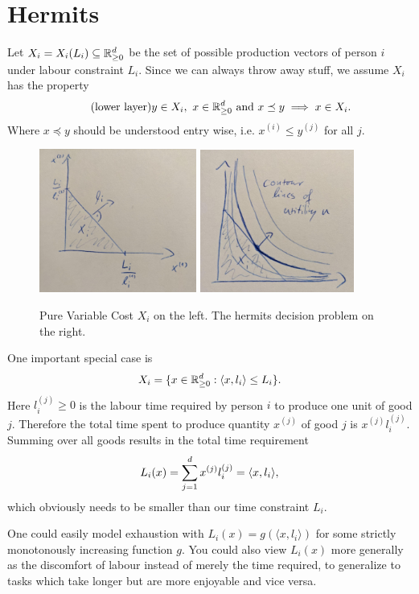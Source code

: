 \section{Hermits}

Let \(X_i = X_i(L_i)\subseteq \mathbb{R}_{\ge 0}^d\) be the set of possible production vectors of person \(i\)
under labour constraint \(L_i\). Since we can always throw away stuff, we
assume \(X_i\) has the property
\[
	\label{eq: lower layer}
	\tag{lower layer}
	y\in X_i,\ x\in\mathbb{R}_{\ge 0}^d \text{ and } x\preceq y \implies x\in X_i.
\]
Where \(x \preceq y\) should be understood entry wise, i.e. \(x^{(i)} \le
y^{(j)}\) for all \(j\).

\begin{figure}
	\centering
	\includegraphics[width=0.46\textwidth]{images/pure-variable-cost.jpeg}
	\includegraphics[width=0.45\textwidth]{images/hermit-decision-pure-variable.jpeg}
	\caption{
		Pure Variable Cost \(X_i\) on the left. The hermits decision problem
		on the right.
	}
\end{figure}
\begin{example*}
	One important special case is
	\[
		X_i = \{ x \in \mathbb{R}_{\ge 0}^d: \langle x, l_i \rangle \le L_i \}.
	\]
	Here \(l_i^{(j)}\ge0\) is the labour time required by person \(i\) to produce one
	unit of good \(j\). Therefore the total time spent to produce quantity
	\(x^{(j)}\) of good \(j\) is \(x^{(j)}l_i^{(j)}\). Summing over all goods
	results in the total time requirement
	\[
		L_i(x) = \sum_{j=1}^d x^{(j)}l_i^{(j)} = \langle x, l_i\rangle,
	\]
	which obviously needs to be smaller than our time constraint \(L_i\).

	One could easily model exhaustion with \(L_i(x) = g(\langle x, l_i\rangle)\)
	for some strictly monotonously increasing function \(g\). You could also
	view \(L_i(x)\) more generally as the discomfort of labour instead of merely
	the time required, to generalize to tasks which take longer but are more
	enjoyable and vice versa.
\end{example*}

